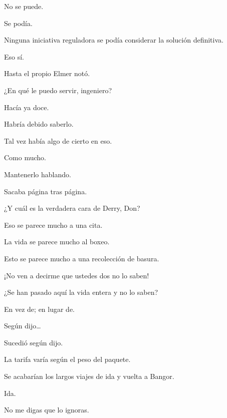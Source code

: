 \sk
No se puede. 

\sk
Se podía. 

\sk
Ninguna iniciativa reguladora se podía considerar la solución definitiva. 

\sk
Eso sí. 

\sk
Hasta el propio Elmer notó. 

\sk
¿En qué le puedo servir, ingeniero? 

\sk
Hacía ya doce. 

\sk
Habría debido saberlo. 

\sk
Tal vez había algo de cierto en eso.  

\sk
Como mucho. 

\sk
Mantenerlo hablando. 

\sk
Sacaba página tras página. 

\sk
¿Y cuál es la verdadera cara de Derry, Don? \nb{}

\sk
Eso se parece mucho a una cita. 

\sk
La vida se parece mucho al boxeo. 

\sk
Esto se parece mucho a una recolección de basura. 

\sk
¡No ven a decirme que ustedes dos no lo saben! \nb{}

\sk
¿Se han pasado aquí la vida entera y no lo saben? \nb{}

\sk
En vez de; en lugar de. 

\sk
Según dijo\ldots{} 

\sk
Sucedió según dijo. 

\sk
La tarifa varía según el peso del paquete. 

\sk
Se acabarían los largos viajes de ida y vuelta a Bangor. 

\sk
Ida. 

\sk
No me digas que lo ignoras. 

